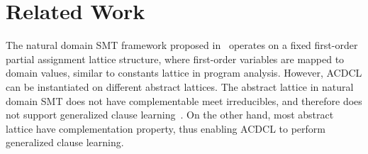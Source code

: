 \section{Related Work}
The natural domain SMT framework proposed in~\cite{ndsmt} operates on
a fixed first-order partial assignment lattice structure, where first-order 
variables are mapped to domain values, similar to constants lattice 
in program analysis.  However, ACDCL can be instantiated on different 
abstract lattices.  The abstract lattice in natural domain SMT does 
not have complementable meet irreducibles, and therefore does not 
support generalized clause learning~\cite{sas}.  On the other hand, 
most abstract lattice have complementation property, thus enabling 
ACDCL to perform generalized clause learning.

